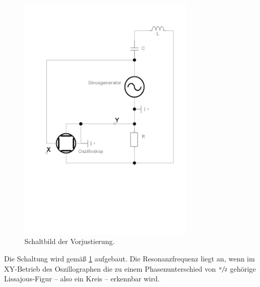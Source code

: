 \begin{figure}
    \centering
    \includegraphics[width=0.75\textwidth]{plots/gekop_schw_kreis2.pdf}
    \caption{Schaltbild der Vorjustierung.}
    \label{fig:vorbereitung}
\end{figure}
Die Schaltung wird gemäß \ref{fig:vorbereitung} aufgebaut. 
Die Resonanzfrequenz liegt an, wenn im XY-Betrieb des Oszillographen die zu einem Phasenunterschied von $\sfrac{\pi}{2}$ 
gehörige Lissajous-Figur --  also ein Kreis -- erkennbar wird.

